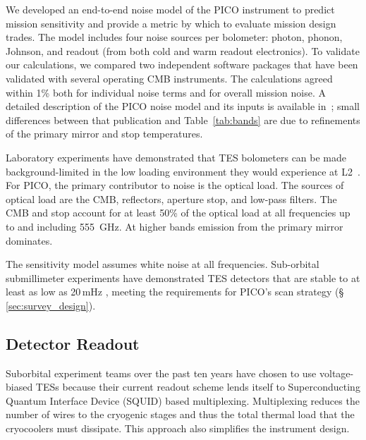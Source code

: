 We developed an end-to-end noise model of the PICO instrument to predict mission sensitivity and provide a metric by which to evaluate mission design trades. The model includes four noise sources per bolometer: photon, phonon, Johnson, and readout (from both cold and warm readout electronics). To validate our calculations, we compared two independent software packages that have been validated with several operating CMB instruments. The calculations agreed within 1\% both for individual noise terms and for overall mission noise. A detailed description of the PICO noise model and its inputs is available in~\citet{Young2018}; small differences between that publication and Table~\ref{tab:bands} are due to refinements of the primary mirror and stop temperatures.


Laboratory experiments have demonstrated that TES bolometers can be made background-limited in the low loading environment they would experience at L2~\citep{Beyer2012}. For PICO, the primary contributor to noise is the optical load. The sources of optical load are the CMB, reflectors, aperture stop, and low-pass filters. The CMB and stop account for at least 50\% of the optical load at all frequencies up to and including 555~GHz. At higher bands emission from the primary mirror dominates.

The sensitivity model assumes white noise at all frequencies. Sub-orbital submillimeter experiments have demonstrated TES detectors that are stable to at least as low as 20\,mHz \citep{Rahlin2014}, meeting the requirements for PICO's scan strategy (\S\,\ref{sec:survey_design}). %

\subsection{Detector Readout}
\label{sec:detector_readout} %

Suborbital experiment teams over the past ten years have chosen to use voltage-biased TESs because their current readout scheme lends itself to Superconducting Quantum Interface Device (SQUID) based multiplexing. Multiplexing reduces the number of wires to the cryogenic stages and thus the total thermal load that the cryocoolers must dissipate. This approach also simplifies the instrument design.

